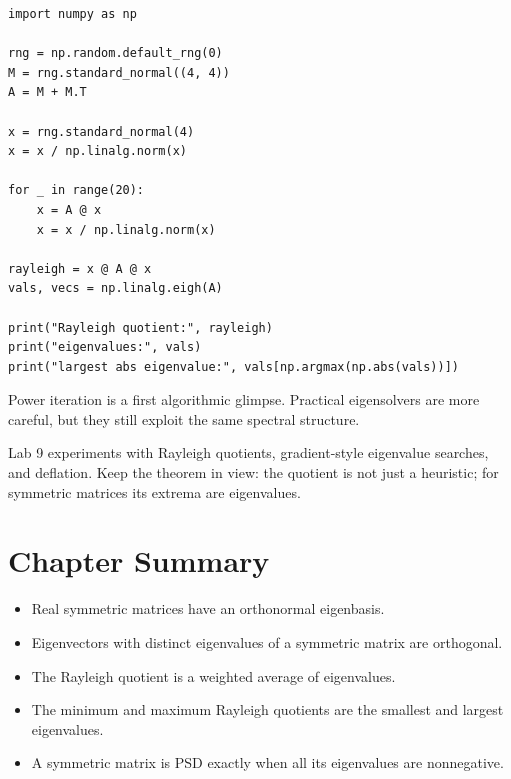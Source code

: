 \begin{lstlisting}
import numpy as np

rng = np.random.default_rng(0)
M = rng.standard_normal((4, 4))
A = M + M.T

x = rng.standard_normal(4)
x = x / np.linalg.norm(x)

for _ in range(20):
    x = A @ x
    x = x / np.linalg.norm(x)

rayleigh = x @ A @ x
vals, vecs = np.linalg.eigh(A)

print("Rayleigh quotient:", rayleigh)
print("eigenvalues:", vals)
print("largest abs eigenvalue:", vals[np.argmax(np.abs(vals))])
\end{lstlisting}

Power iteration is a first algorithmic glimpse. Practical eigensolvers are more
careful, but they still exploit the same spectral structure.

\begin{labbox}
Lab 9 experiments with Rayleigh quotients, gradient-style eigenvalue searches,
and deflation. Keep the theorem in view: the quotient is not just a heuristic;
for symmetric matrices its extrema are eigenvalues.
\end{labbox}

\section*{Chapter Summary}

\begin{itemize}
  \item Real symmetric matrices have an orthonormal eigenbasis.
  \item Eigenvectors with distinct eigenvalues of a symmetric matrix are
        orthogonal.
  \item The Rayleigh quotient is a weighted average of eigenvalues.
  \item The minimum and maximum Rayleigh quotients are the smallest and largest
        eigenvalues.
  \item A symmetric matrix is PSD exactly when all its eigenvalues are
        nonnegative.
\end{itemize}


